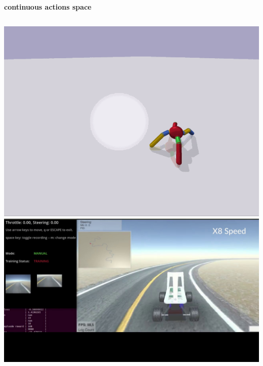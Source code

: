 \documentclass[xcolor=dvipsnames]{beamer}
\begin{document}
\begin{frame}{\bf continuous actions space}

  \begin{columns}

    \begin{column}{0.5\textwidth}
      {\centering \includegraphics[scale=0.2]{../images/ant.png}}
      {\centering \includegraphics[scale=0.1]{../images/sac_car.jpg}}
    \end{column}


\end{columns}
\end{frame}
\end{document}
